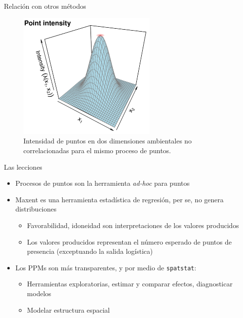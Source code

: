 \documentclass[
  11pt,
  ignorenonframetext,
]{beamer}
\providecommand{\tightlist}{%
  \setlength{\itemsep}{0pt}\setlength{\parskip}{0pt}}
\begin{document}
\begin{frame}{Relación con otros métodos}
\protect\hypertarget{relaciuxf3n-con-otros-muxe9todos-4}{}
\begin{figure}

{\centering \includegraphics[width=2.7in]{Figuras/Figuras-centroide/Point-intensity} 

}

\caption{Intensidad de puntos en dos dimensiones ambientales no correlacionadas para el mismo proceso de puntos.}\label{fig:unnamed-chunk-9}
\end{figure}
\end{frame}

\begin{frame}[fragile]{Las lecciones}
\protect\hypertarget{las-lecciones}{}
\begin{itemize}
\item
  Procesos de puntos son la herramienta \emph{ad-hoc} para puntos
\item
  Maxent es una herramienta estadística de regresión, per se, no genera
  distribuciones

  \begin{itemize}
  \item
    Favorabilidad, idoneidad son interpretaciones de los valores
    producidos
  \item
    Los valores producidos representan el número esperado de puntos de
    presencia (exceptuando la salida logística)
  \end{itemize}
\item
  Los PPMs son más transparentes, y por medio de \texttt{spatstat}:

  \begin{itemize}
  \tightlist
  \item
    Herramientas exploratorias, estimar y comparar efectos, diagnosticar
    modelos
  \item
    Modelar estructura espacial
  \end{itemize}
\end{itemize}
\end{frame}
\end{document}
